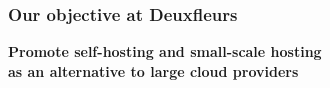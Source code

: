\documentclass[aspectratio=169,xcolor={svgnames}]{beamer}
\begin{document}
\begin{frame}
	\frametitle{Our objective at Deuxfleurs}
	
	\begin{center}
		\textbf{Promote self-hosting and small-scale hosting\\
			as an alternative to large cloud providers}
	\end{center}
	\vspace{2em}
\end{frame}
\end{document}
